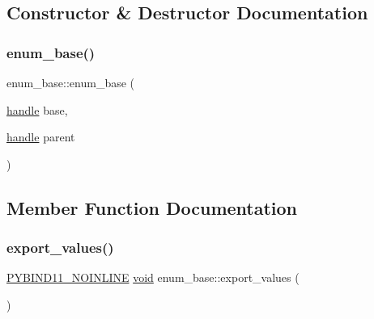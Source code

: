 \subsection{Constructor \& Destructor Documentation}
\mbox{\label{structenum__base_a4798327fe83475e6f117dc5d03709d70}} 
\subsubsection{\texorpdfstring{enum\_base()}{enum\_base()}}
{\footnotesize\ttfamily enum\+\_\+base\+::enum\+\_\+base (\begin{DoxyParamCaption}\item[{\mbox{\hyperlink{classhandle}{handle}}}]{base,  }\item[{\mbox{\hyperlink{classhandle}{handle}}}]{parent }\end{DoxyParamCaption})\hspace{0.3cm}{\ttfamily [inline]}}



\subsection{Member Function Documentation}
\mbox{\label{structenum__base_aceb25051fa6f046399a3c6c1c43f1b27}} 
\subsubsection{\texorpdfstring{export\_values()}{export\_values()}}
{\footnotesize\ttfamily \mbox{\hyperlink{detail_2common_8h_a1fb186b7494d5c576d902c0730ecbb71}{P\+Y\+B\+I\+N\+D11\+\_\+\+N\+O\+I\+N\+L\+I\+NE}} \mbox{\hyperlink{_s_d_l__opengles2__gl2ext_8h_ae5d8fa23ad07c48bb609509eae494c95}{void}} enum\+\_\+base\+::export\+\_\+values (\begin{DoxyParamCaption}{ }\end{DoxyParamCaption})\hspace{0.3cm}{\ttfamily [inline]}}

\mbox{\label{structenum__base_a0c6afbca40877b86be3840947b39596c}} 
